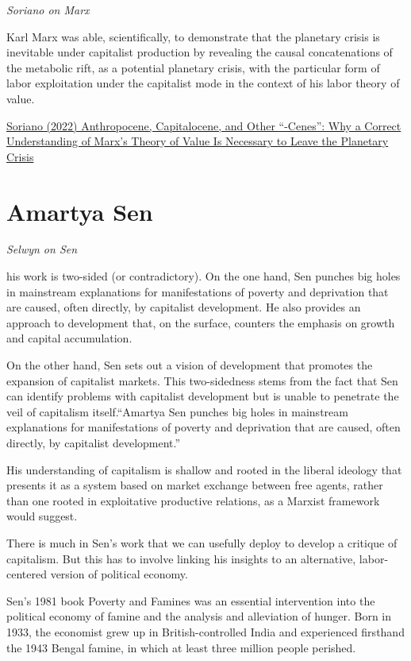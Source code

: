 \documentclass[
]{book}
\begin{document}
\emph{Soriano on Marx}

Karl Marx was able, scientifically, to demonstrate that the planetary crisis is inevitable under capitalist production by revealing the causal concatenations of the metabolic rift, as a potential planetary crisis, with the particular form of labor exploitation under the capitalist mode in the context of his labor theory of value.

\href{https://monthlyreview.org/2022/11/01/anthropocene-capitalocene-and-other-cenes-why-a-correct-understanding-of-marxs-theory-of-value-is-necessary-to-leave-the-planetary-crisis/}{Soriano (2022) Anthropocene, Capitalocene, and Other ``-Cenes'': Why a Correct Understanding of Marx's Theory of Value Is Necessary to Leave the Planetary Crisis}

\hypertarget{amartya-sen}{%
\section{Amartya Sen}\label{amartya-sen}}

\emph{Selwyn on Sen}

his work is two-sided (or contradictory). On the one hand, Sen punches big holes in mainstream explanations for manifestations of poverty and deprivation that are caused, often directly, by capitalist development. He also provides an approach to development that, on the surface, counters the emphasis on growth and capital accumulation.

On the other hand, Sen sets out a vision of development that promotes the expansion of capitalist markets. This two-sidedness stems from the fact that Sen can identify problems with capitalist development but is unable to penetrate the veil of capitalism itself.``Amartya Sen punches big holes in mainstream explanations for manifestations of poverty and deprivation that are caused, often directly, by capitalist development.''

His understanding of capitalism is shallow and rooted in the liberal ideology that presents it as a system based on market exchange between free agents, rather than one rooted in exploitative productive relations, as a Marxist framework would suggest.

There is much in Sen's work that we can usefully deploy to develop a critique of capitalism. But this has to involve linking his insights to an alternative, labor-centered version of political economy.

Sen's 1981 book Poverty and Famines was an essential intervention into the political economy of famine and the analysis and alleviation of hunger. Born in 1933, the economist grew up in British-controlled India and experienced firsthand the 1943 Bengal famine, in which at least three million people perished.
\end{document}
